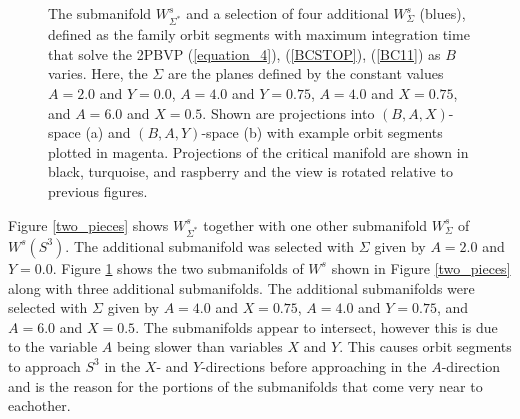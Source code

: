 \documentclass{ws-ijbc}
\begin{document}
\begin{figure}[ht]
\centering
{}
\caption{The submanifold $W^{s}_{\Sigma^*}$ and a selection of four additional $W^{s}_{\Sigma}$ (blues), defined as the family orbit segments with maximum integration time that solve the 2PBVP (\ref{equation_4}), (\ref{BCSTOP}), (\ref{BC11}) as $B$ varies.  Here, the $\Sigma$ are the planes defined by the constant values $A=2.0$ and $Y=0.0$, $A=4.0$ and $Y=0.75$, $A=4.0$ and $X=0.75$, and $A=6.0$ and $X=0.5$.  Shown are projections into $(B,A,X)$-space (a) and $(B,A,Y)$-space (b) with example orbit segments plotted in magenta.  Projections of the critical manifold are shown in black, turquoise, and raspberry and the view is rotated relative to previous figures.}
\label{pieces}
\end{figure}


Figure \ref{two_pieces} shows $W^s_{\Sigma^*}$ together with one other submanifold $W^{s}_{\Sigma}$ of $W^{s}(S^3)$.  The additional submanifold was selected with $\Sigma$ given by $A=2.0$ and $Y=0.0$.  Figure \ref{pieces} shows the two submanifolds of $W^{s}$ shown in Figure \ref{two_pieces} along with three additional submanifolds.  The additional submanifolds were selected with $\Sigma$ given by $A=4.0$ and $X=0.75$, $A=4.0$ and $Y=0.75$, and $A=6.0$ and $X=0.5$.  The submanifolds appear to intersect, however this is due to the variable $A$ being slower than variables $X$ and $Y$.  This causes orbit segments to approach $S^3$ in the $X$- and $Y$-directions before approaching in the $A$-direction and is the reason for the portions of the submanifolds that come very near to eachother.
    
\end{document}
